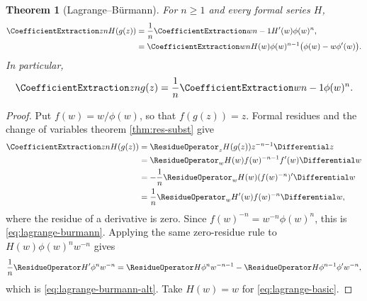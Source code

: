 \documentclass[11pt,a4paper,oneside,openany]{book}
\newtheorem{theorem}{Theorem}[chapter]
\theoremstyle{definition}
\theoremstyle{remark}
\begin{document}
\begin{theorem}[Lagrange--Bürmann]\label{thm:lagrange-burmann}
For $n\ge1$ and every formal series $H$,
\begin{align}
 \CoefficientExtraction zn H(g(z))
 &=\frac1n\CoefficientExtraction w{n-1}H'(w)\phi(w)^n,
 \label{eq:lagrange-burmann}\\
 &=\CoefficientExtraction wn H(w)\phi(w)^{n-1}\bigl(\phi(w)-w\phi'(w)\bigr).
 \label{eq:lagrange-burmann-alt}
\end{align}
In particular,
\begin{equation}\label{eq:lagrange-basic}
 \CoefficientExtraction zn g(z)=\frac1n\CoefficientExtraction w{n-1}\phi(w)^n.
\end{equation}
\end{theorem}
\begin{proof}
Put $f(w)=w/\phi(w)$, so that $f(g(z))=z$.  Formal residues and the change of
variables theorem \cref{thm:res-subst} give
\begin{align*}
 \CoefficientExtraction zn H(g(z))
 &=\ResidueOperator_z H(g(z))z^{-n-1}\Differential z\\
 &=\ResidueOperator_w H(w)f(w)^{-n-1}f'(w)\Differential w\\
 &=-\frac1n\ResidueOperator_w H(w)(f(w)^{-n})'\Differential w\\
 &=\frac1n\ResidueOperator_w H'(w)f(w)^{-n}\Differential w,
\end{align*}
where the residue of a derivative is zero.  Since
$f(w)^{-n}=w^{-n}\phi(w)^n$, this is
\eqref{eq:lagrange-burmann}.  Applying the same zero-residue rule to
$H(w)\phi(w)^nw^{-n}$ gives
\[
 \frac1n\ResidueOperator H'\phi^nw^{-n}
 =\ResidueOperator H\phi^nw^{-n-1}-\ResidueOperator H\phi^{n-1}\phi'w^{-n},
\]
which is \eqref{eq:lagrange-burmann-alt}.  Take $H(w)=w$ for
\eqref{eq:lagrange-basic}.
\end{proof}
\end{document}
